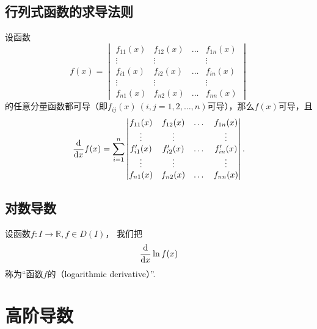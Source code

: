 \subsection{行列式函数的求导法则}
\begin{theorem}
\def\f#1{f_{#1}(x)}%
\def\g#1{f_{#1}'(x)}%
设函数\[
f(x) = \begin{vmatrix}
\f{11} & \f{12} & \dots & \f{1n} \\
\vdots & \vdots & & \vdots \\
\f{i1} & \f{i2} & \dots & \f{in} \\
\vdots & \vdots & & \vdots \\
\f{n1} & \f{n2} & \dots & \f{nn}
\end{vmatrix}
\]的任意分量函数都可导（即\(\f{ij}\ (i,j=1,2,\dotsc,n)\)可导），那么\(f(x)\)可导，且\[
\dv{x} f(x) = \sum\limits_{i=1}^n \begin{vmatrix}
\f{11} & \f{12} & \dots & \f{1n} \\
\vdots & \vdots & & \vdots \\
\g{i1} & \g{i2} & \dots & \g{in} \\
\vdots & \vdots & & \vdots \\
\f{n1} & \f{n2} & \dots & \f{nn}
\end{vmatrix}.
\]
\end{theorem}

\subsection{对数导数}
\begin{definition}
设函数\(f\colon I \to \mathbb{R}, f \in D(I)\)，
我们把\[
	\dv{x} \ln f(x)
\]称为“函数\(f\)的（logarithmic derivative）”.
\end{definition}

\section{高阶导数}
